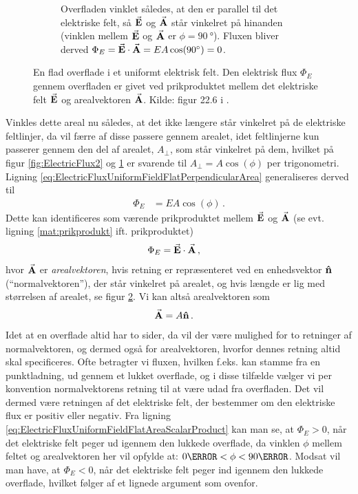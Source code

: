 \begin{figure}[h!]
\begin{subfigure}[t]{.3\textwidth}
        \caption{Overfladen vinklet således, at den er parallel til det elektriske felt, så $\va{E}$ og $\va{A}$ står vinkelret på hinanden (vinklen mellem $\va{E}$ og $\va{A}$ er $\phi = \SI{90}{\degree}$). Fluxen bliver derved $\Phi_E = \va{E} \cdot \va{A} = EA\cos(\SI{90}{\degree}) = 0$.}
        \label{fig:ElectricFlux3}
    \end{subfigure}
    \caption{En flad overflade i et uniformt elektrisk felt. Den elektrisk flux $\Phi_E$ gennem overfladen er givet ved prikproduktet mellem det elektriske felt $\va{E}$ og arealvektoren $\va{A}$. Kilde: figur 22.6 i \cite{youngSearsZemanskyUniversity2016}.}
    \label{fig:ElectricFlux}
\end{figure}

Vinkles dette areal nu således, at det ikke længere står vinkelret på de elektriske feltlinjer, da vil færre af disse passere gennem arealet, idet feltlinjerne kun passerer gennem den del af arealet, $A_\perp$, som står vinkelret på dem, hvilket på figur \ref{fig:ElectricFlux2} og \ref{fig:ElectricFlux3} er svarende til $A_\perp = A\cos(\phi)$ per trigonometri.
Ligning \eqref{eq:ElectricFluxUniformFieldFlatPerpendicularArea} generaliseres derved til
\begin{align} \label{eq:ElectricFluxUniformFieldFlatArea}
	\Phi_E &= EA\cos(\phi) \, .
\end{align}
Dette kan identificeres som værende prikproduktet mellem $\va{E}$ og $\va{A}$ (se evt. ligning \eqref{mat:prikprodukt} ift. prikproduktet)
\begin{align} \label{eq:ElectricFluxUniformFieldFlatAreaScalarProduct}
	\Phi_E &= \va{E} \cdot \va{A} \, ,
\end{align}
hvor $\va{A}$ er \emph{arealvektoren}, hvis retning er repræsenteret ved en enhedsvektor $\vu{n}$ (``normalvektoren''), der står vinkelret på arealet, og hvis længde er lig med størrelsen af arealet, se figur \ref{fig:ElectricFlux}. Vi kan altså arealvektoren som
\begin{align} \label{eq:ElectricFluxAreaVector}
	\va{A} &= A\vu{n} \, .
\end{align}
Idet at en overflade altid har to sider, da vil der være mulighed for to retninger af normalvektoren, og dermed også for arealvektoren, hvorfor dennes retning altid skal specificeres. Ofte betragter vi fluxen, hvilken f.eks. kan stamme fra en punktladning, ud gennem et lukket overflade, og i disse tilfælde vælger vi per konvention normalvektorens retning til at være udad fra overfladen. Det vil dermed være retningen af det elektriske felt, der bestemmer om den elektriske flux er positiv eller negativ. Fra ligning \eqref{eq:ElectricFluxUniformFieldFlatAreaScalarProduct} kan man se, at $\Phi_E>0$, når det elektriske felt peger ud igennem den lukkede overflade, da vinklen $\phi$ mellem feltet og arealvektoren her vil opfylde at: $0\degree < \phi < 90\degree$. Modsat vil man have, at $\Phi_E < 0$, når det elektriske felt peger ind igennem den lukkede overflade, hvilket følger af et lignede argument som ovenfor.

